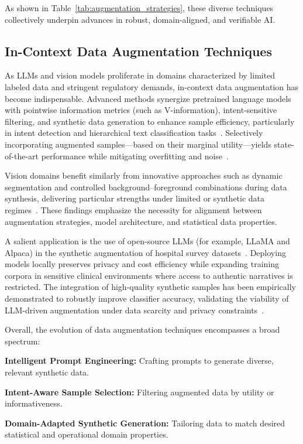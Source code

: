 \documentclass[sigconf]{acmart}
\begin{document}
As shown in Table~\ref{tab:augmentation_strategies}, these diverse techniques collectively underpin advances in robust, domain-aligned, and verifiable AI.

\subsection{In-Context Data Augmentation Techniques}

As LLMs and vision models proliferate in domains characterized by limited labeled data and stringent regulatory demands, in-context data augmentation has become indispensable. Advanced methods synergize pretrained language models with pointwise information metrics (such as V-information), intent-sensitive filtering, and synthetic data generation to enhance sample efficiency, particularly in intent detection and hierarchical text classification tasks~\cite{ref61}. Selectively incorporating augmented samples—based on their marginal utility—yields state-of-the-art performance while mitigating overfitting and noise~\cite{ref61}.

Vision domains benefit similarly from innovative approaches such as dynamic segmentation and controlled background–foreground combinations during data synthesis, delivering particular strengths under limited or synthetic data regimes~\cite{ref62}. These findings emphasize the necessity for alignment between augmentation strategies, model architecture, and statistical data properties.

A salient application is the use of open-source LLMs (for example, LLaMA and Alpaca) in the synthetic augmentation of hospital survey datasets~\cite{ref57}. Deploying models locally preserves privacy and cost efficiency while expanding training corpora in sensitive clinical environments where access to authentic narratives is restricted. The integration of high-quality synthetic samples has been empirically demonstrated to robustly improve classifier accuracy, validating the viability of LLM-driven augmentation under data scarcity and privacy constraints~\cite{ref57}.

Overall, the evolution of data augmentation techniques encompasses a broad spectrum:

\textbf{Intelligent Prompt Engineering:} Crafting prompts to generate diverse, relevant synthetic data. 

\textbf{Intent-Aware Sample Selection:} Filtering augmented data by utility or informativeness.

\textbf{Domain-Adapted Synthetic Generation:} Tailoring data to match desired statistical and operational domain properties.
\end{document}
